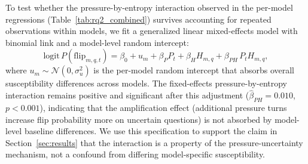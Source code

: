 To test whether the pressure-by-entropy interaction observed in the
per-model regressions (Table~\ref{tab:rq2_combined}) survives accounting for
repeated observations within models, we fit a generalized linear
mixed-effects model with binomial link and a model-level random
intercept:
\[
\mathrm{logit}\,P(\mathrm{flip}_{m,q,t}) = \beta_0 + u_m + \beta_P P_t + \beta_H H_{m,q} + \beta_{PH}\,P_t H_{m,q},
\]
where $u_m \sim \mathcal{N}(0, \sigma_u^2)$ is the per-model random
intercept that absorbs overall susceptibility differences across
models. The fixed-effects pressure-by-entropy interaction remains
positive and significant after this adjustment
($\hat\beta_{PH} = 0.010$, $p < 0.001$), indicating that the
amplification effect (additional pressure turns increase flip
probability more on uncertain questions) is not absorbed by
model-level baseline differences. We use this specification to
support the claim in Section~\ref{sec:results} that the interaction
is a property of the pressure-uncertainty mechanism, not a
confound from differing model-specific susceptibility.
